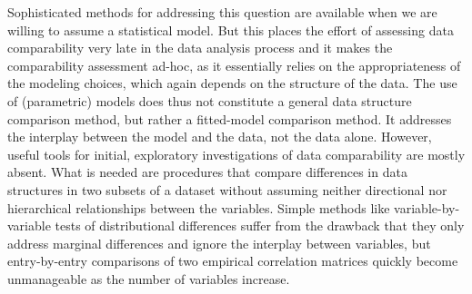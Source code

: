 \documentclass[a4paper,12pt]{article}
\begin{document}
Sophisticated methods for addressing this question are available when we are willing to assume a statistical model. But this places the effort of assessing data comparability very late in the data analysis process and it makes the comparability assessment ad-hoc, as it essentially relies on the appropriateness of the modeling choices, which again depends on the structure of the data. The use of (parametric) models does thus not constitute a general data structure comparison method, but rather a fitted-model comparison method. It addresses the interplay between the model and the data, not the data alone. However, useful tools for initial, exploratory investigations of data comparability %
are mostly absent. What is needed are procedures that compare differences in data structures in two subsets of a dataset without assuming neither directional nor hierarchical relationships between the variables.  Simple methods like variable-by-variable tests of distributional differences suffer from the drawback that they only address marginal differences and ignore the interplay between variables, but entry-by-entry comparisons of two empirical correlation matrices quickly become unmanageable as the number of variables increase.

\end{document}
